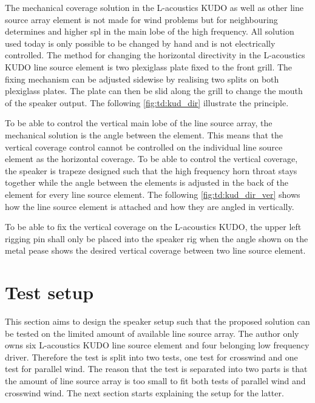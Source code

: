 


The mechanical coverage solution in the L-acoustics KUDO as well as other line source array element is not made for wind problems but for neighbouring determines and higher \gls{spl} in the main lobe of the high frequency. All solution used today is only possible to be changed by hand and is not electrically controlled. The method for changing the horizontal directivity in the L-acoustics KUDO line source element is two plexiglass plate fixed to the front grill. The fixing mechanism can be adjusted sidewise by realising two splits on both plexiglass plates. The plate can then be slid along the grill to change the mouth of the speaker output. The following \autoref{fig:td:kud_dir} illustrate the principle.


To be able to control the vertical main lobe of the line source array, the mechanical solution is the angle between the element. This means that the vertical coverage control cannot be controlled on the individual line source element as the horizontal coverage. To be able to control the vertical coverage, the speaker is trapeze designed such that the high frequency horn throat stays together while the angle between the elements is adjusted in the back of the element for every line source element. The following \autoref{fig:td:kud_dir_ver} shows how the line source element is attached and how they are angled in vertically.


To be able to fix the vertical coverage on the L-acoustics KUDO, the upper left rigging pin shall only be placed into the speaker rig when the angle shown on the metal pease shows the desired vertical coverage between two line source element.  

\section{Test setup}\label{sec:pro:test_setup}
This section aims to design the speaker setup such that the proposed solution can be tested on the limited amount of available line source array. The author only owns six L-acoustics KUDO line source element and four belonging low frequency driver. Therefore the test is split into two tests, one test for crosswind and one test for parallel wind. The reason that the test is separated into two parts is that the amount of line source array is too small to fit both tests of parallel wind and crosswind wind. The next section starts explaining the setup for the latter.

